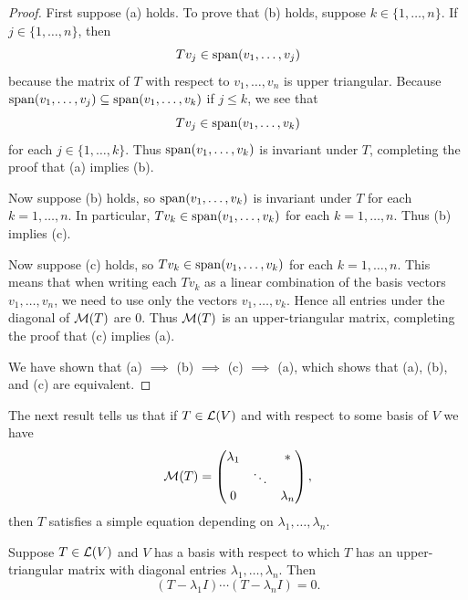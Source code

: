 \begin{proof}
First suppose (a) holds. To prove that (b) holds, suppose $k\in\{1,\dots,n\}$.
If $j\in\{1,\dots,n\}$, then
\[ Tv_j\in\operatorname{span}(v_1,\dots,v_j) \]
because the matrix of $T$ with respect to $v_1,\dots,v_n$ is upper triangular.
Because $\operatorname{span}(v_1,\dots,v_j)\subseteq\operatorname{span}(v_1,\dots,v_k)$ if $j\le k$, we see
that
\[ Tv_j\in\operatorname{span}(v_1,\dots,v_k) \]
for each $j\in\{1,\dots,k\}$. Thus $\operatorname{span}(v_1,\dots,v_k)$ is invariant under $T$,
completing the proof that (a) implies (b).

Now suppose (b) holds, so $\operatorname{span}(v_1,\dots,v_k)$ is invariant under $T$ for each
$k=1,\dots,n$. In particular, $Tv_k\in\operatorname{span}(v_1,\dots,v_k)$ for each
$k=1,\dots,n$. Thus (b) implies (c).

Now suppose (c) holds, so $Tv_k\in\operatorname{span}(v_1,\dots,v_k)$ for each $k=1,\dots,n$.
This means that when writing each $Tv_k$ as a linear combination of the basis
vectors $v_1,\dots,v_n$, we need to use only the vectors $v_1,\dots,v_k$. Hence
all entries under the diagonal of $\mathcal{M}(T)$ are $0$. Thus $\mathcal{M}(T)$ is an
upper-triangular matrix, completing the proof that (c) implies (a).

We have shown that (a) $\implies$ (b) $\implies$ (c) $\implies$ (a), which shows
that (a), (b), and (c) are equivalent.
\end{proof}

The next result tells us that if $T\in\mathcal{L}(V)$ and with respect to some basis of
$V$ we have
\[ \mathcal{M}(T) = \begin{pmatrix} \lambda_1 & & *\\ & \ddots & \\ 0 & & \lambda_n
   \end{pmatrix}, \]
then $T$ satisfies a simple equation depending on $\lambda_1,\dots,\lambda_n$.

\begin{result}%
\label{ax:5.40}
Suppose $T\in\mathcal{L}(V)$ and $V$ has a basis with respect to which $T$ has an
upper-triangular matrix with diagonal entries $\lambda_1,\dots,\lambda_n$. Then
\[ (T-\lambda_1I)\cdots(T-\lambda_nI)=0. \]
\end{result}

